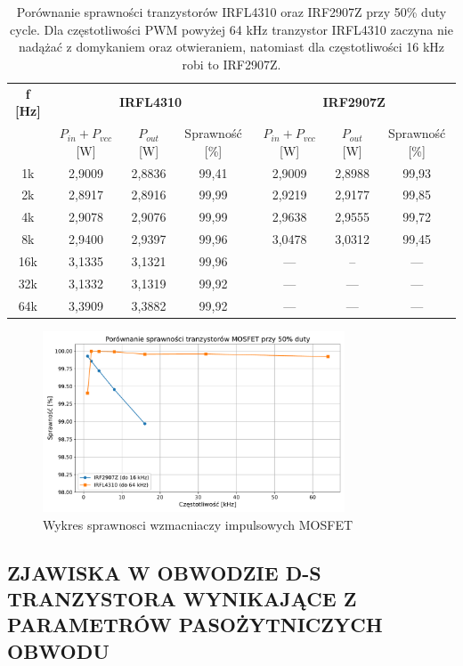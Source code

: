\documentclass[11pt]{article}
\begin{document}
\begin{table}[H]
\centering
\begin{tabular}{|c|c|c|c|c|c|c|}
\hline
\textbf{f [Hz]} & \multicolumn{3}{c|}{\textbf{IRFL4310}} & \multicolumn{3}{c|}{\textbf{IRF2907Z}} \\
\cline{2-7}
 & $P_{in}+P_{vcc}$ [W] & $P_{out}$ [W] & Sprawność [\%] & $P_{in}+P_{vcc}$ [W] & $P_{out}$ [W] & Sprawność [\%] \\
\hline
1k   & 2,9009 & 2,8836 & 99,41 & 2,9009 & 2,8988 & 99,93 \\
\hline
2k   & 2,8917 & 2,8916 & 99,99 & 2,9219 & 2,9177 & 99,85 \\
\hline
4k   & 2,9078 & 2,9076 & 99,99 & 2,9638 & 2,9555 & 99,72 \\
\hline
8k   & 2,9400 & 2,9397 & 99,96 & 3,0478 & 3,0312 & 99,45 \\
\hline
16k  & 3,1335 & 3,1321 & 99,96 & --- & -- & --- \\
\hline
32k  & 3,1332 & 3,1319 & 99,92 & --- & --- & --- \\
\hline
64k  & 3,3909 & 3,3882 & 99,92 & --- & --- & --- \\
\hline
\end{tabular}
\caption{Porównanie sprawności tranzystorów IRFL4310 oraz IRF2907Z przy 50\% duty cycle. Dla częstotliwości PWM powyżej 64 kHz tranzystor IRFL4310 zaczyna nie nadążać z domykaniem oraz otwieraniem, natomiast dla częstotliwości 16 kHz robi to IRF2907Z.}
\end{table}

\begin{figure}[H]
\centering
\includegraphics[width=0.8\textwidth]{aun1_imp_mosfet_comparison.pdf}
\caption{Wykres sprawnosci wzmacniaczy impulsowych MOSFET}
\end{figure}

\subsection{ZJAWISKA W OBWODZIE D-S TRANZYSTORA WYNIKAJĄCE Z PARAMETRÓW PASOŻYTNICZYCH OBWODU}
\end{document}
